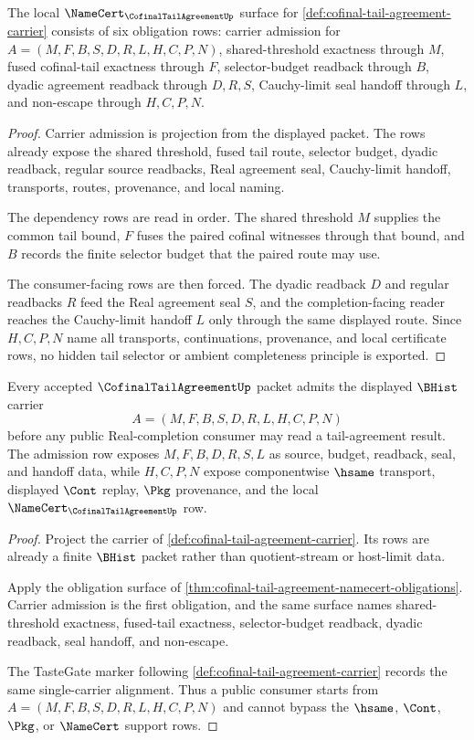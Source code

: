 \begin{theorem}
\label{thm:cofinal-tail-agreement-namecert-obligations}
The local $\NameCert_{\CofinalTailAgreementUp}$ surface for \autoref{def:cofinal-tail-agreement-carrier} consists of six obligation rows: carrier admission for $A=(M,F,B,S,D,R,L,H,C,P,N)$, shared-threshold exactness through $M$, fused cofinal-tail exactness through $F$, selector-budget readback through $B$, dyadic agreement readback through $D,R,S$, Cauchy-limit seal handoff through $L$, and non-escape through $H,C,P,N$.
\end{theorem}
\begin{proof}
Carrier admission is projection from the displayed packet. The rows already expose the shared threshold, fused tail route, selector budget, dyadic readback, regular source readbacks, Real agreement seal, Cauchy-limit handoff, transports, routes, provenance, and local naming.

The dependency rows are read in order. The shared threshold $M$ supplies the common tail bound, $F$ fuses the paired cofinal witnesses through that bound, and $B$ records the finite selector budget that the paired route may use.

The consumer-facing rows are then forced. The dyadic readback $D$ and regular readbacks $R$ feed the Real agreement seal $S$, and the completion-facing reader reaches the Cauchy-limit handoff $L$ only through the same displayed route. Since $H,C,P,N$ name all transports, continuations, provenance, and local certificate rows, no hidden tail selector or ambient completeness principle is exported.
\end{proof}

\begin{theorem}
\label{thm:cofinal-tail-agreement-carrier-admission}
Every accepted $\CofinalTailAgreementUp$ packet admits the displayed $\BHist$ carrier
$$
A=(M,F,B,S,D,R,L,H,C,P,N)
$$
before any public Real-completion consumer may read a tail-agreement result. The admission row exposes $M,F,B,D,R,S,L$ as source, budget, readback, seal, and handoff data, while $H,C,P,N$ expose componentwise $\hsame$ transport, displayed $\Cont$ replay, $\Pkg$ provenance, and the local $\NameCert_{\CofinalTailAgreementUp}$ row.
\end{theorem}
\begin{proof}
Project the carrier of \autoref{def:cofinal-tail-agreement-carrier}. Its rows are already a finite $\BHist$ packet rather than quotient-stream or host-limit data.

Apply the obligation surface of \autoref{thm:cofinal-tail-agreement-namecert-obligations}. Carrier admission is the first obligation, and the same surface names shared-threshold exactness, fused-tail exactness, selector-budget readback, dyadic readback, seal handoff, and non-escape.

The TasteGate marker following \autoref{def:cofinal-tail-agreement-carrier} records the same single-carrier alignment. Thus a public consumer starts from $A=(M,F,B,S,D,R,L,H,C,P,N)$ and cannot bypass the $\hsame$, $\Cont$, $\Pkg$, or $\NameCert$ support rows.
\end{proof}

